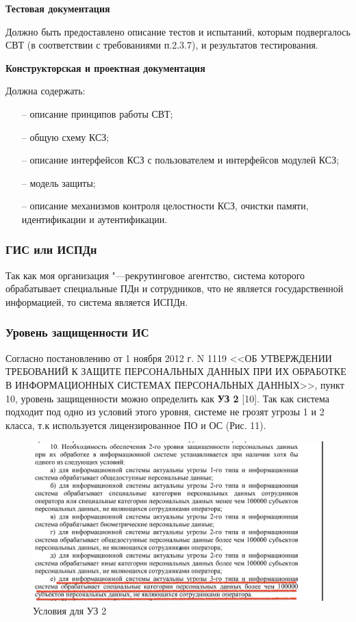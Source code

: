 \textbf{Тестовая документация}

Должно быть предоставлено описание тестов и испытаний, которым
подвергалось СВТ (в соответствии с требованиями п.2.3.7), и результатов
тестирования.

\textbf{Конструкторская и проектная документация}

Должна содержать:
\begin{itemize}
  \item [--] описание принципов работы СВТ;
  \item [--] общую схему КСЗ;
  \item [--] описание интерфейсов КСЗ с пользователем и интерфейсов модулей КСЗ;
  \item [--] модель защиты;
  \item [--] описание механизмов контроля целостности КСЗ, очистки памяти,
  идентификации и аутентификации.
\end{itemize}


\subsubsection{ГИС или ИСПДн}

Так как моя организация "---рекрутинговое агентство, система которого обрабатывает специальные ПДн и сотрудников,
что не является государственной информацией, то система является ИСПДн.


\subsubsection{Уровень защищенности ИС}
Согласно постановлению от 1 ноября 2012 г. N 1119 <<ОБ УТВЕРЖДЕНИИ ТРЕБОВАНИЙ
К ЗАЩИТЕ ПЕРСОНАЛЬНЫХ ДАННЫХ ПРИ ИХ ОБРАБОТКЕ В ИНФОРМАЦИОННЫХ СИСТЕМАХ ПЕРСОНАЛЬНЫХ ДАННЫХ>>,
пункт 10, уровень защищенности можно определить как \textbf{УЗ 2} [10]. Так как система
подходит под одно из условий этого уровня, системе не грозят угрозы 1 и 2 класса, т.к используется лицензированное
ПО и ОС (Рис. 11).

\begin{figure}[H]
  \centering
  \includegraphics[width=1.1\textwidth]{pict/6}
  \caption{Условия для УЗ 2}
  \label{fig:4}
\end{figure}

